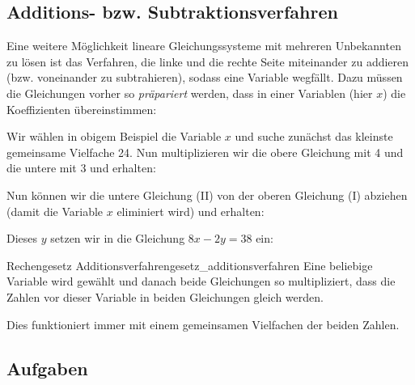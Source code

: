 
\subsection{Additions- bzw. Subtraktionsverfahren}
Eine weitere Möglichkeit lineare Gleichungssysteme mit mehreren Unbekannten zu lösen ist das Verfahren, die linke und die rechte Seite miteinander zu addieren (bzw. voneinander zu subtrahieren), sodass eine Variable wegfällt. Dazu müssen die Gleichungen vorher so \textit{präpariert} werden, dass in einer Variablen (hier \zB $x$) die Koeffizienten übereinstimmen:


Wir wählen \zB in obigem Beispiel die Variable $x$ und suche zunächst
das kleinste gemeinsame Vielfache 24. Nun multiplizieren wir die obere
Gleichung mit 4 und die untere mit 3 und erhalten:




Nun können wir die untere Gleichung (II) von der oberen Gleichung (I) abziehen (damit die Variable $x$ eliminiert wird)
und erhalten:
  


  Dieses $y$ setzen wir \zB in die Gleichung $8x-2y=38$ ein:
\newpage


  \begin{rezept}{Rechengesetz Additionsverfahren}{gesetz_additionsverfahren}
    Eine beliebige Variable wird gewählt und danach beide Gleichungen so multipliziert,
    dass die Zahlen vor dieser Variable in beiden Gleichungen gleich werden.

    Dies funktioniert
    immer mit einem gemeinsamen Vielfachen der beiden Zahlen.
  \end{rezept}

\subsection*{Aufgaben}

\newpage
